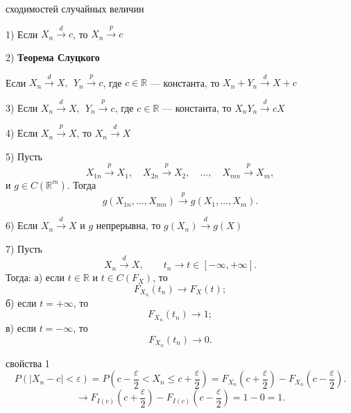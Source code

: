 \documentclass[12pt,a4paper]{article}
\begin{document}
\begin{props}{сходимостей случайных величин}

1) Если $X_n\xrightarrow{d}c$, то $X_n\xrightarrow{p}c$

\bigskip

2) \textbf{Теорема Слуцкого}

Если $X_n\xrightarrow{d}X, \ \ Y_n\xrightarrow{p}c$,
   где $c\in\mathbb{R}$ --- константа, то $X_n + Y_n\xrightarrow{d}X + c$

\bigskip

3) Если $X_n\xrightarrow{d}X, \ \ Y_n\xrightarrow{p}c$,
   где $c\in\mathbb{R}$ --- константа, то $X_nY_n\xrightarrow{d}cX$

\bigskip

4) Если $X_n\xrightarrow{p}X$, то $X_n\xrightarrow{d}X$

\bigskip
   
5) Пусть
   \[
   X_{1n}\xrightarrow{p}X_1,\quad
   X_{2n}\xrightarrow{p}X_2,\quad \ldots,\quad
   X_{mn}\xrightarrow{p}X_m,
   \]
   и $g\in C(\mathbb{R}^m)$. Тогда
   \[
   g(X_{1n},\ldots,X_{mn})
   \xrightarrow{p}
   g(X_1,\ldots,X_m).
   \]

\bigskip

6) Если $X_n\xrightarrow{d}X$ и $g$ непрерывна, то $g(X_n)\xrightarrow{d}g(X)$

\bigskip
   
7) Пусть
   \[
   X_n\xrightarrow{d}X,
   \qquad
   t_n\longrightarrow t\in[-\infty,+\infty].
   \]
   Тогда:
а) если $t\in\mathbb{R}$ и $t\in C(F_X)$, то
\[
F_{X_n}(t_n)\longrightarrow F_X(t);
\]
б) если $t=+\infty$, то
\[
F_{X_n}(t_n)\longrightarrow1;
\]
в) если $t=-\infty$, то
\[
F_{X_n}(t_n)\longrightarrow0.
\]
\end{props}

\begin{proofbox}{свойства 1}
\[
P(|X_n-c|<\varepsilon)
=
P\left(c-\frac{\varepsilon}{2}<X_n\leq c+\frac{\varepsilon}{2}\right)
=
F_{X_n}\left(c+\frac{\varepsilon}{2}\right)
-
F_{X_n}\left(c-\frac{\varepsilon}{2}\right).
\]
\[
\longrightarrow
F_{I(c)}\left(c+\frac{\varepsilon}{2}\right)
-
F_{I(c)}\left(c-\frac{\varepsilon}{2}\right)
=
1-0=1.
\]
\end{proofbox}
\end{document}

